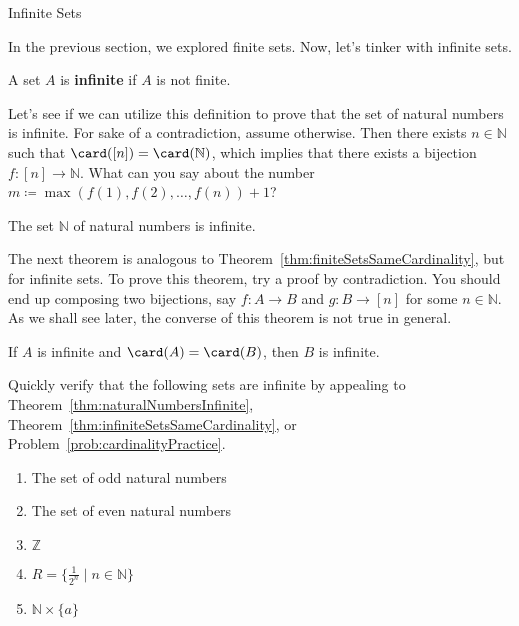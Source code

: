 \begin{section}{Infinite Sets}

In the previous section, we explored finite sets.  Now, let's tinker with infinite sets.

\begin{definition}\label{def:infiniteSet}
A set $A$ is \textbf{infinite} if $A$ is not finite.
\end{definition}

Let's see if we can utilize this definition to prove that the set of natural numbers is infinite. For sake of a contradiction, assume otherwise.  Then there exists $n\in\mathbb{N}$ such that $\card([n])=\card(\mathbb{N})$, which implies that there exists a bijection $f:[n]\to \mathbb{N}$. What can you say about the number $m\coloneqq \max(f(1),f(2),\ldots,f(n))+1$?

\begin{theorem}\label{thm:naturalNumbersInfinite}
The set $\mathbb{N}$ of natural numbers is infinite.
\end{theorem}

The next theorem is analogous to Theorem~\ref{thm:finiteSetsSameCardinality}, but for infinite sets. To prove this theorem, try a proof by contradiction. You should end up composing two bijections, say $f:A\to B$ and $g:B\to [n]$ for some $n\in\mathbb{N}$. As we shall see later, the converse of this theorem is not true in general. 

\begin{theorem}\label{thm:infiniteSetsSameCardinality}
If $A$ is infinite and $\card(A)=\card(B)$, then $B$ is infinite.
\end{theorem}

\begin{problem}\label{prob:someInfiniteSets}
Quickly verify that the following sets are infinite by appealing to Theorem~\ref{thm:naturalNumbersInfinite}, Theorem~\ref{thm:infiniteSetsSameCardinality}, or Problem~\ref{prob:cardinalityPractice}.
\begin{enumerate}[label=\textrm{(\alph*)}]
\item The set of odd natural numbers
\item The set of even natural numbers
\item $\mathbb{Z}$
\item $R=\{\frac{1}{2^n}\mid n\in \mathbb{N}\}$
\item $\mathbb{N}\times \{a\}$
\end{enumerate}
\end{problem}


\end{section}
